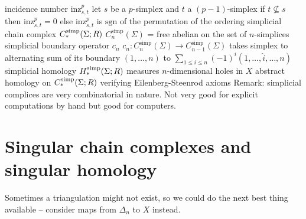 \begin{outline}
    \1 incidence number $\text{inz}^p_{s,t}$
        \2 let $s$ be a $p$-simplex and $t$ a $(p-1)$-simplex
            \3 if $t\not\subseteq s$ then $\text{inz}^p_{s,t}=0$
            \3 else $\text{inz}^p_{s,t}$ is $\text{sgn}$ of the permutation of the ordering
    \1 simplicial chain complex $C^{\operatorname{simp}}_*(\Sigma;R)$ 
        \2 $C^{\text{simp}}_n(\Sigma)$ = free abelian on the set of $n$-simplices
    \1 simplicial boundary operator $c_n$
        \2 $c_n:C^{\text{simp}}_n(\Sigma)\rightarrow C^{\text{simp}}_{n-1}(\Sigma)$
        \2 takes simplex to alternating sum of its boundary $(1,\ldots, n)$ to $\sum_{1\leq i \leq n} (-1)^i(1,\ldots,\hat{i},\ldots,n)$ 
    \1 simplicial homology $H^{\operatorname{simp}}_*(\Sigma;R)$
        \2 measures $n$-dimensional holes in $X$
        \2 abstract homology on $C^{\operatorname{simp}}_*(\Sigma;R)$
        \2 verifying Eilenberg-Steenrod axioms
\0 Remark: simplicial complices are very combinatorial in nature. Not very good for explicit computations by hand but good for computers.
\end{outline}

\section{Singular chain complexes and singular homology}

Sometimes a triangulation might not exist, so we could do the next best thing available -- consider maps from $\Delta_n$ to $X$ instead. 

